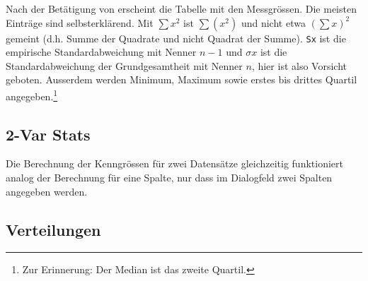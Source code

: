\documentclass[a4paper,11pt,notitlepage,halfparskip,headsepline,normalheadings,twoside]{scrartcl}
\newlength{\tikey}
\newcommand{\keystroke}[1]{\settowidth{\tikey}{\scriptsize #1}\psframebox[framearc=0.2]{\parbox{\tikey}{\scriptsize\textsf{#1}}}}
\begin{document}
\begin{window}
Nach der Betätigung von \keystroke{ENTER} erscheint die Tabelle mit den
Messgrössen. Die meisten Einträge sind selbsterklärend. Mit $\sum x^2$ ist
$\sum\left(x^2\right)$ und nicht etwa $\left(\sum x\right)^2$ gemeint (d.h. Summe der
Quadrate und nicht Quadrat der Summe). \texttt{Sx} ist die empirische
Standardabweichung mit Nenner $n-1$ und $\sigma x$ ist die Standardabweichung
der Grundgesamtheit mit Nenner $n$, hier ist also Vorsicht geboten. Ausserdem
werden Minimum, Maximum sowie erstes bis drittes Quartil angegeben.\footnote{Zur
Erinnerung: Der Median ist das zweite Quartil.}
\end{window}

\subsection{2-Var Stats}
Die Berechnung der Kenngrössen für zwei Datensätze gleichzeitig funktioniert analog
der Berechnung für eine Spalte, nur dass im Dialogfeld zwei Spalten angegeben
werden.


\subsection{Verteilungen}
\end{document}
